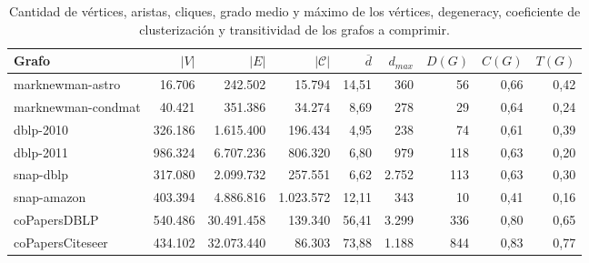 \begin{table}
	\caption{Cantidad de vértices, aristas, cliques, grado medio y máximo de los vértices, degeneracy, coeficiente de clusterización y transitividad de los grafos a comprimir.}
	\label{table:gafros3}
	\centering
	\small
	\begin{tabular}{l|r|r|r|r|r|r|r|r}
		\toprule
		Grafo & $|V|$ & $|E|$ & $|\mathcal{C}|$ & $\overline{d}$ & $d_{max}$ & $D(G)$ & $C(G)$ & $T(G)$ \\
		\midrule
		marknewman-astro & 16.706 & 242.502 & 15.794 & 14,51 & 360 & 56 & 0,66 & 0,42  \\
		marknewman-condmat & 40.421 & 351.386 & 34.274 & 8,69 & 278 & 29 & 0,64 & 0,24 \\
		dblp-2010 & 326.186 & 1.615.400 & 196.434 & 4,95 & 238 & 74 & 0,61 & 0,39  \\
        dblp-2011 & 986.324 & 6.707.236 & 806.320 & 6,80 & 979 & 118 & 0,63 & 0,20 \\
		snap-dblp & 317.080 & 2.099.732 & 257.551 & 6,62 & 2.752 & 113 & 0,63 & 0,30 \\
        snap-amazon & 403.394 & 4.886.816 & 1.023.572 & 12,11 & 343 & 10 & 0,41 & 0,16 \\
        coPapersDBLP & 540.486 & 30.491.458 & 139.340 & 56,41 & 3.299 & 336 & 0,80 & 0,65 \\
        coPapersCiteseer & 434.102 & 32.073.440 & 86.303 & 73,88 & 1.188 & 844 & 0,83 & 0,77 \\
    	\bottomrule
	\end{tabular}
\end{table}
